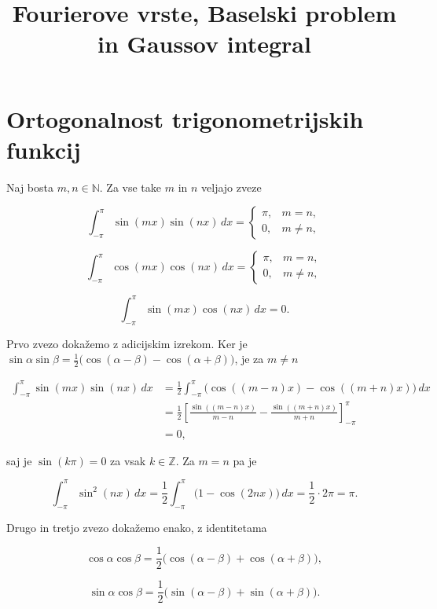 \documentclass[
  slovene,
]{article}
\title{Fourierove vrste, Baselski problem in Gaussov integral}
\author{}
\date{}
\begin{document}
\maketitle

\section{Ortogonalnost trigonometrijskih
funkcij}\label{ortogonalnost-trigonometrijskih-funkcij}

Naj bosta \(m, n \in \mathbb{N}\). Za vse take \(m\) in \(n\) veljajo
zveze

\[\int_{-\pi}^{\pi} \sin(mx) \sin(nx) \, dx = \begin{cases} \pi, & m = n, \\ 0, & m \neq n, \end{cases}\]

\[\int_{-\pi}^{\pi} \cos(mx) \cos(nx) \, dx = \begin{cases} \pi, & m = n, \\ 0, & m \neq n, \end{cases}\]

\[\int_{-\pi}^{\pi} \sin(mx) \cos(nx) \, dx = 0.\]

Prvo zvezo dokažemo z adicijskim izrekom. Ker je
\(\sin \alpha \sin \beta = \frac{1}{2} \bigl( \cos(\alpha - \beta) - \cos(\alpha + \beta) \bigr)\),
je za \(m \neq n\)

\[\begin{aligned}
\int_{-\pi}^{\pi} \sin(mx) \sin(nx) \, dx
&= \frac{1}{2} \int_{-\pi}^{\pi} \bigl( \cos((m - n)x) - \cos((m + n)x) \bigr) \, dx \\
&= \frac{1}{2} \left[ \frac{\sin((m - n)x)}{m - n} - \frac{\sin((m + n)x)}{m + n} \right]_{-\pi}^{\pi} \\
&= 0,
\end{aligned}\]

saj je \(\sin(k\pi) = 0\) za vsak \(k \in \mathbb{Z}\). Za \(m = n\) pa
je

\[\int_{-\pi}^{\pi} \sin^2(nx) \, dx = \frac{1}{2} \int_{-\pi}^{\pi} \bigl( 1 - \cos(2nx) \bigr) \, dx = \frac{1}{2} \cdot 2\pi = \pi.\]

Drugo in tretjo zvezo dokažemo enako, z identitetama

\[\cos \alpha \cos \beta = \frac{1}{2} \bigl( \cos(\alpha - \beta) + \cos(\alpha + \beta) \bigr),\]

\[\sin \alpha \cos \beta = \frac{1}{2} \bigl( \sin(\alpha - \beta) + \sin(\alpha + \beta) \bigr).\]
\end{document}
